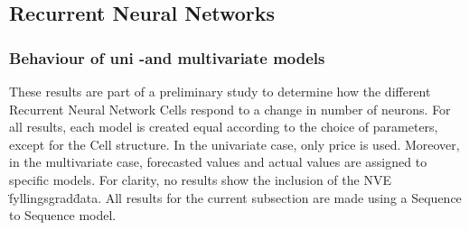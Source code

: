 \documentclass
[twocolumn,
secnumarabic,
nobibnotes,
aps,
prl,
reprint,
groupedaddress,
amsmath,
amssymb,
]{revtex4-2}
\begin{document}
\subsection{Recurrent Neural Networks}

\subsubsection{Behaviour of uni -and multivariate models}
These results are part of a preliminary study to determine how the different Recurrent Neural Network Cells respond to a change in number of neurons. For all results, each model is created equal according to the choice of parameters, except for the Cell structure. In the univariate case, only price is used. Moreover, in the multivariate case, forecasted values and actual values are assigned to specific models. For clarity, no results show the inclusion of the NVE \"fyllingsgrad\" data. All results for the current subsection are made using a Sequence to Sequence model.
\end{document}

